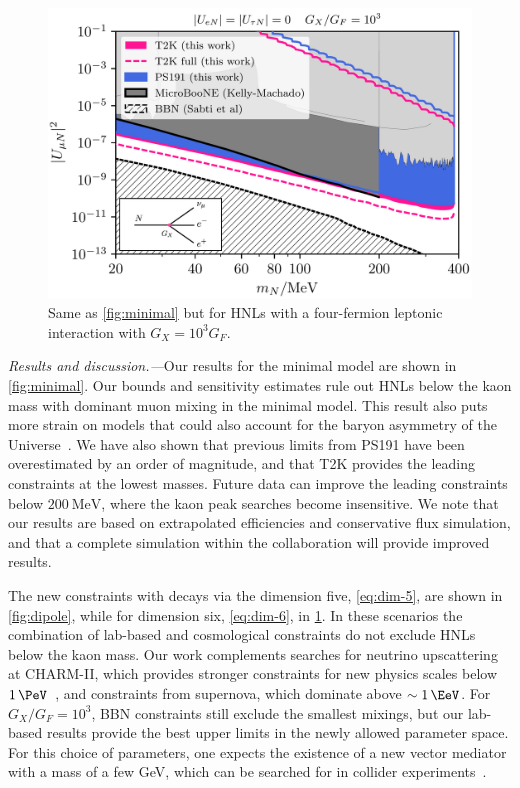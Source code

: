 \documentclass[
reprint,
superscriptaddress,
showpacs,
preprintnumbers,
bibnotes,
amsmath,
amssymb,
aps,
prd,
floatfix
]{revtex4-2}
\begin{document}
\begin{figure}[t]
    \centering
    \includegraphics[width=\columnwidth]{figures/Fig-3.pdf}
    \caption{Same as \cref{fig:minimal} but for HNLs with a four-fermion leptonic interaction with $G_X = 10^{3} G_F$.}
    \label{fig:hidden_sector}
\end{figure}

\emph{Results and discussion.---}Our results for the minimal model are shown in \cref{fig:minimal}. 
Our bounds and sensitivity estimates rule out HNLs below the kaon mass with dominant muon mixing in the minimal model. 
This result also puts more strain on models that could also account for the baryon asymmetry of the Universe~\cite{Bondarenko:2021cpc}.
We have also shown that previous limits from PS191 have been overestimated by an order of magnitude, and that T2K provides the leading constraints at the lowest masses. 
Future data can improve the leading constraints below $\SI{200}\MeV$, where the kaon peak searches become insensitive.
We note that our results are based on extrapolated efficiencies and conservative flux simulation, and that a complete simulation within the collaboration will provide improved results.

The new constraints with decays via the dimension five, \cref{eq:dim-5}, are shown in \cref{fig:dipole}, while for dimension six, \cref{eq:dim-6}, in \cref{fig:hidden_sector}. 
In these scenarios the combination of lab-based and cosmological constraints do not exclude HNLs below the kaon mass.
Our work complements searches for neutrino upscattering at CHARM-II, which provides stronger constraints for new physics scales below $\SI{1}\PeV$~\cite{Coloma:2017ppo,Magill:2018jla}, and constraints from supernova, which dominate above $\sim\SI{1}\EeV$.
For $G_X/G_F=10^{3}$, BBN constraints still exclude the smallest mixings, but our lab-based results provide the best upper limits in the newly allowed parameter space. 
For this choice of parameters, one expects the existence of a new vector mediator with a mass of a few GeV, which can be searched for in collider experiments~\cite{Fabbrichesi:2020wbt}.
\end{document}
